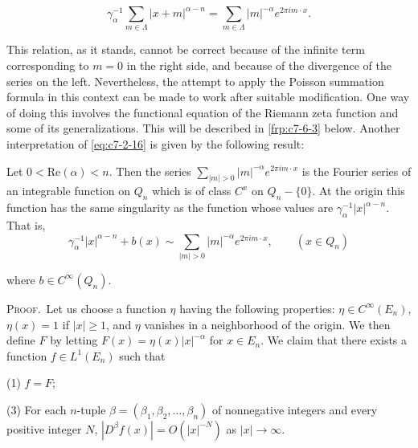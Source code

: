 \begin{equation}\label{eq:c7-2-16}
\gamma_{\alpha}^{-1}\sum_{m\in\Lambda}|x+m|^{\alpha-n}=\sum_{m\in\Lambda}|m|^{-\alpha}e^{2\pi i m\cdot x}.
\end{equation}

This relation, as it stands, cannot be correct because of the infinite term corresponding to $m = 0$ in the right side, and because of the divergence of the series on the left. Nevertheless, the attempt to apply the Poisson summation formula in this context can be made to work after suitable modification. One way of doing this involves the functional equation of the Riemann zeta function and some of its generalizations. This will be described in \eqref{frp:c7-6-3} below. Another interpretation of \eqref{eq:c7-2-16} is given by the following result:

\begin{theorem}
\label{thm:c7-2-17}
Let $0 < \text{Re}(\alpha) < n$. Then the series $\sum_{|m| > 0} |m|^{-\alpha} e^{2\pi i m \cdot x}$ is the Fourier series of an integrable function on $Q_n$ which is of class $C^x$ on $Q_n - \{0\}$. At the origin this function has the same singularity as the function whose values are $\gamma_{\alpha}^{-1}|x|^{\alpha - n}$. That is,
\[
\gamma_{\alpha}^{-1}\vert x\vert^{\alpha-n}+b(x)\sim\sum_{\vert m\vert>0}\vert m\vert^{-\alpha}e^{2\pi i m\cdot x},\qquad(x\in Q_{n})
\]

where $b \in C^{\infty}(Q_n)$.
\end{theorem}

\textsc{Proof.}\ Let us choose a function $\eta$ having the following properties: $\eta \in C^\infty(E_n)$, $\eta(x) = 1$ if $|x| \geq 1$, and $\eta$ vanishes in a neighborhood of the origin. We then define $F$ by letting $F(x) = \eta(x)|x|^{-\alpha}$ for $x \in E_n$. We claim that there exists a function $f \in L^1(E_n)$ such that

(1) $\hat{f} = F$;

(3) For each $n$-tuple $\beta = (\beta_1, \beta_2, \ldots, \beta_n)$ of nonnegative integers and every positive integer $N$, $|D^\beta f(x)| = O(|x|^{-N})$ as $|x| \to \infty$.

